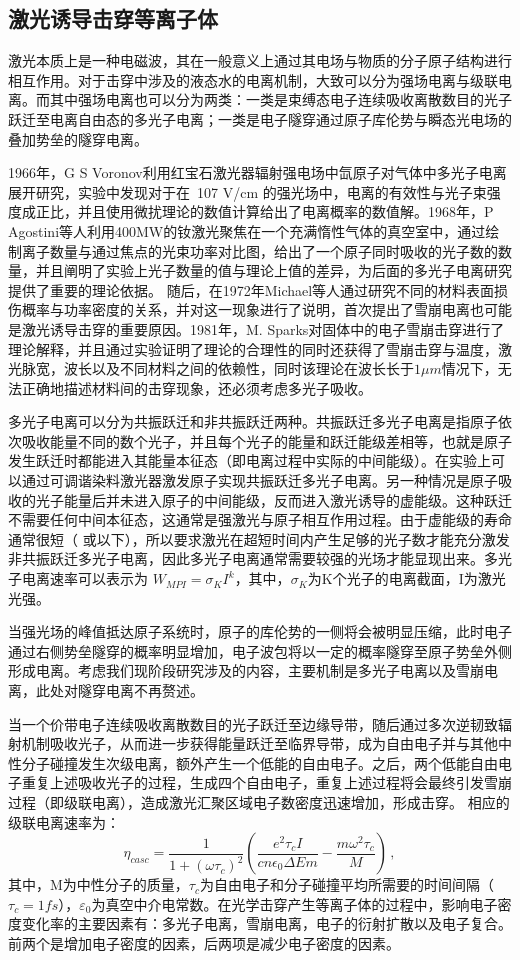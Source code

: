 \subsection{激光诱导击穿等离子体}
激光本质上是一种电磁波，其在一般意义上通过其电场与物质的分子原子结构进行相互作用。对于击穿中涉及的液态水的电离机制，大致可以分为强场电离与级联电离。而其中强场电离也可以分为两类：一类是束缚态电子连续吸收离散数目的光子跃迁至电离自由态的多光子电离；一类是电子隧穿通过原子库伦势与瞬态光电场的叠加势垒的隧穿电离。

1966年，G S Voronov\cite{voronov_multiphoton_1966}利用红宝石激光器辐射强电场中氙原子对气体中多光子电离展开研究，实验中发现对于在~107 V/cm 的强光场中，电离的有效性与光子束强度成正比，并且使用微扰理论的数值计算给出了电离概率的数值解。1968年，P Agostini\cite{agostini_multiphoton_1968}等人利用400MW的钕激光聚焦在一个充满惰性气体的真空室中，通过绘制离子数量与通过焦点的光束功率对比图，给出了一个原子同时吸收的光子数的数量，并且阐明了实验上光子数量的值与理论上值的差异，为后面的多光子电离研究提供了重要的理论依据。 随后，在1972年Michael\cite{bass_avalanche_1972}等人通过研究不同的材料表面损伤概率与功率密度的关系，并对这一现象进行了说明，首次提出了雪崩电离也可能是激光诱导击穿的重要原因。1981年，M. Sparks\cite{sparks_theory_1980}对固体中的电子雪崩击穿进行了理论解释，并且通过实验证明了理论的合理性的同时还获得了雪崩击穿与温度，激光脉宽，波长以及不同材料之间的依赖性，同时该理论在波长长于$1\mu m$情况下，无法正确地描述材料间的击穿现象，还必须考虑多光子吸收。

多光子电离可以分为共振跃迁和非共振跃迁两种。共振跃迁多光子电离是指原子依次吸收能量不同的数个光子，并且每个光子的能量和跃迁能级差相等，也就是原子发生跃迁时都能进入其能量本征态（即电离过程中实际的中间能级）。在实验上可以通过可调谐染料激光器激发原子实现共振跃迁多光子电离。另一种情况是原子吸收的光子能量后并未进入原子的中间能级，反而进入激光诱导的虚能级。这种跃迁不需要任何中间本征态，这通常是强激光与原子相互作用过程。由于虚能级的寿命通常很短（ 或以下），所以要求激光在超短时间内产生足够的光子数才能充分激发非共振跃迁多光子电离，因此多光子电离通常需要较强的光场才能显现出来。多光子电离速率可以表示为 $W_{MPI}=\sigma_KI^k$，其中，$\sigma_K$为K个光子的电离截面，I为激光光强。

当强光场的峰值抵达原子系统时，原子的库伦势的一侧将会被明显压缩，此时电子通过右侧势垒隧穿的概率明显增加，电子波包将以一定的概率隧穿至原子势垒外侧形成电离。考虑我们现阶段研究涉及的内容，主要机制是多光子电离以及雪崩电离，此处对隧穿电离不再赘述。

当一个价带电子连续吸收离散数目的光子跃迁至边缘导带，随后通过多次逆韧致辐射机制吸收光子，从而进一步获得能量跃迁至临界导带，成为自由电子并与其他中性分子碰撞发生次级电离，额外产生一个低能的自由电子。之后，两个低能自由电子重复上述吸收光子的过程，生成四个自由电子，重复上述过程将会最终引发雪崩过程（即级联电离），造成激光汇聚区域电子数密度迅速增加，形成击穿。
相应的级联电离速率为：
$$\eta_{casc}=\frac{1}{1+(\omega\tau_c)^2} (\frac{e^2 \tau_c I}{cn\epsilon_0 \Delta Em}-\frac{m\omega^2 \tau_c}{M})\,,$$
其中，M为中性分子的质量，$\tau_c$为自由电子和分子碰撞平均所需要的时间间隔（$\tau_c=1fs$），$\varepsilon_0$为真空中介电常数。在光学击穿产生等离子体的过程中，影响电子密度变化率的主要因素有：多光子电离，雪崩电离，电子的衍射扩散以及电子复合。前两个是增加电子密度的因素，后两项是减少电子密度的因素。

